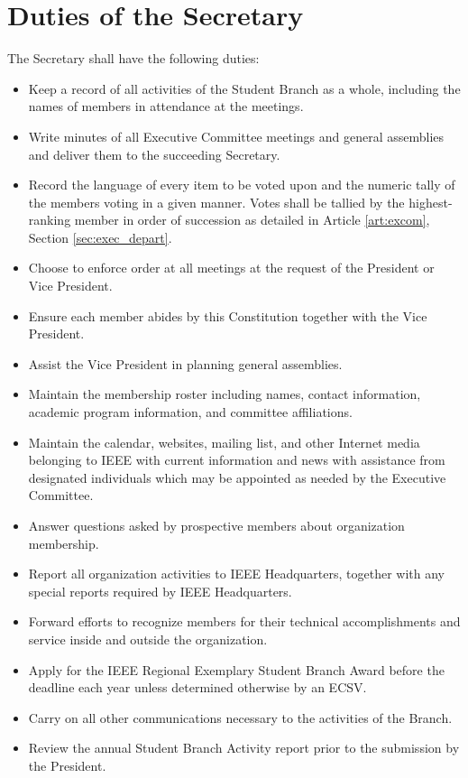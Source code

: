 \documentclass[12pt]{constitution}
\begin{document}
\section{Duties of the Secretary}
\label{sec:officer_sec}
The Secretary shall have the following duties:
\begin{itemize}
    \item Keep a record of all activities of the Student Branch as a whole, including the names of members in attendance at the meetings.
    \item Write minutes of all Executive Committee meetings and general assemblies and deliver them to the succeeding Secretary.
    \item Record the language of every item to be voted upon and the numeric tally of the members voting in a given manner. Votes shall be tallied by the highest-ranking member in order of succession as detailed in Article \ref{art:excom}, Section \ref{sec:exec_depart}. 
    \item Choose to enforce order at all meetings at the request of the President or Vice President.
    \item Ensure each member abides by this Constitution together with the Vice President.
    \item Assist the Vice President in planning general assemblies.
    \item Maintain the membership roster including names, contact information, academic program information, and committee affiliations.
    \item Maintain the calendar, websites, mailing list, and other Internet media belonging to IEEE with current information and news with assistance from designated individuals which may be appointed as needed by the Executive Committee.
    \item Answer questions asked by prospective members about organization membership.
    \item Report all organization activities to IEEE Headquarters, together with any special reports required by IEEE Headquarters.
    \item Forward efforts to recognize members for their technical accomplishments and service inside and outside the organization.
    \item Apply for the IEEE Regional Exemplary Student Branch Award before the deadline each year unless determined otherwise by an ECSV.
    \item Carry on all other communications necessary to the activities of the Branch. 
    \item Review the annual Student Branch Activity report prior to the submission by the President.
\end{itemize}
\end{document}
